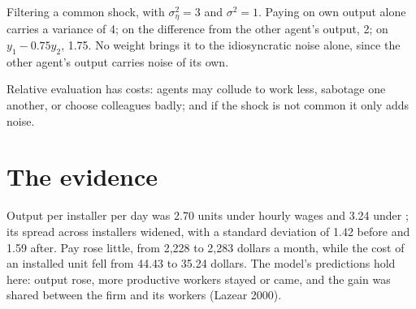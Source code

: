 \begin{omfigure}

{\small Filtering a common shock, with $\sigma_\eta^2 = 3$ and $\sigma^2 = 1$. Paying on own output alone carries a variance of 4; on the difference
from the other agent's output, 2; on $y_1 - 0.75y_2$, 1.75. No weight brings it to the idiosyncratic noise alone, since the other
agent's output carries noise of its own.}
\end{omfigure}

Relative evaluation has costs: agents may collude to work less, sabotage one another, or choose colleagues badly; and
if the shock is not common it only adds noise.

\section{The evidence}\label{sec:b2:moral-hazard:evidence}

\begin{record}
Output per installer per day was 2.70 units under hourly wages and 3.24 under ; its spread across installers
widened, with a standard deviation of 1.42 before and 1.59 after. Pay rose little, from 2{,}228 to 2{,}283 dollars a month,
while the cost of an installed unit fell from 44.43 to 35.24 dollars. The model's predictions hold here: output rose, more
productive workers stayed or came, and the gain was shared between the firm and its workers (Lazear 2000).
\end{record}

